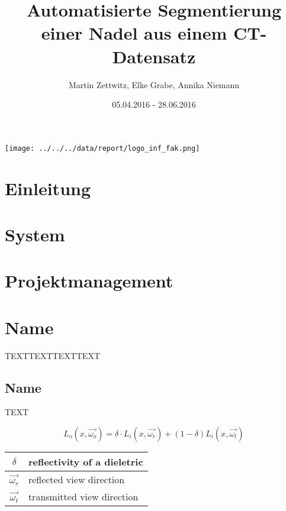 \documentclass[11pt,a4paper]{article}
\begin{document}
	
\begin{titlepage}
\title{Automatisierte Segmentierung \\ einer Nadel aus einem CT-Datensatz}
\date{05.04.2016 - 28.06.2016}
\author{Martin Zettwitz,  Elke Grabe,  Annika Niemann}
\maketitle


\begin{center}
\texttt{[image: ../../../data/report/logo\_inf\_fak.png]}
\end{center}




\end{titlepage}

\tableofcontents


\newpage
\section{Einleitung}
\label{sec:Einleitung}


\newpage
\section{System}
\label{sec:System}



\newpage
\section{Projektmanagement}
\label{sec:Projektmanagemt}



\newpage
\section{Name}
\label{sec:Name}
TEXTTEXTTEXTTEXT

\newpage
\subsection{Name}
\label{sec:Name2}
TEXT

\begin{equation}
L_o(x,\vec{\omega_o})= \delta \cdot L_i(x,\vec{\omega_r}) + (1-\delta) L_i(x,\vec{\omega_t})
\end{equation}

\begin{table}[H]
\begin{tabular}{| c | l |}
\hline
$\delta$ & reflectivity of a dieletric\\ \hline
$\vec{\omega_r}$ & reflected view direction\\ \hline
$\vec{\omega_t}$ & transmitted view direction\\ \hline
\end{tabular}
\end{table}
\end{document}

